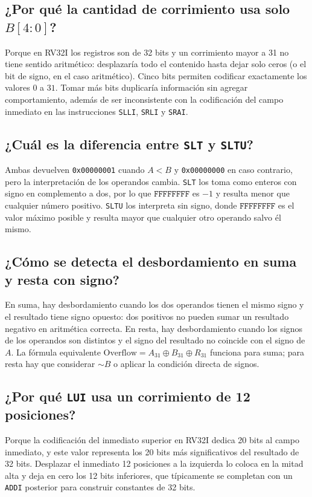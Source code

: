 \documentclass[12pt,letterpaper]{article}
\begin{document}
\subsection{¿Por qué la cantidad de corrimiento usa solo $B[4:0]$?}
Porque en RV32I los registros son de 32 bits y un corrimiento mayor a 31 no tiene sentido aritmético: desplazaría todo el contenido hasta dejar solo ceros (o el bit de signo, en el caso aritmético). Cinco bits permiten codificar exactamente los valores $0$ a $31$. Tomar más bits duplicaría información sin agregar comportamiento, además de ser inconsistente con la codificación del campo inmediato en las instrucciones \texttt{SLLI}, \texttt{SRLI} y \texttt{SRAI}.

\subsection{¿Cuál es la diferencia entre \texttt{SLT} y \texttt{SLTU}?}
Ambas devuelven \texttt{0x00000001} cuando $A < B$ y \texttt{0x00000000} en caso contrario, pero la interpretación de los operandos cambia. \texttt{SLT} los toma como enteros con signo en complemento a dos, por lo que $\mathtt{FFFFFFFF}$ es $-1$ y resulta menor que cualquier número positivo. \texttt{SLTU} los interpreta sin signo, donde $\mathtt{FFFFFFFF}$ es el valor máximo posible y resulta mayor que cualquier otro operando salvo él mismo.

\subsection{¿Cómo se detecta el desbordamiento en suma y resta con signo?}
En suma, hay desbordamiento cuando los dos operandos tienen el mismo signo y el resultado tiene signo opuesto: dos positivos no pueden sumar un resultado negativo en aritmética correcta. En resta, hay desbordamiento cuando los signos de los operandos son distintos y el signo del resultado no coincide con el signo de $A$. La fórmula equivalente $\text{Overflow} = A_{31} \oplus B_{31} \oplus R_{31}$ funciona para suma; para resta hay que considerar $\sim B$ o aplicar la condición directa de signos.

\subsection{¿Por qué \texttt{LUI} usa un corrimiento de 12 posiciones?}
Porque la codificación del inmediato superior en RV32I dedica 20 bits al campo inmediato, y este valor representa los 20 bits más significativos del resultado de 32 bits. Desplazar el inmediato 12 posiciones a la izquierda lo coloca en la mitad alta y deja en cero los 12 bits inferiores, que típicamente se completan con un \texttt{ADDI} posterior para construir constantes de 32 bits.
\end{document}
